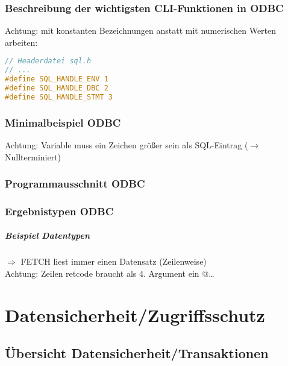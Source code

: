 \subsection{Beschreibung der wichtigsten CLI-Funktionen in ODBC}
Achtung: mit konstanten Bezeichnungen anstatt mit numerischen Werten arbeiten:
\begin{lstlisting}[language=C]
// Headerdatei sql.h
// ...
#define SQL_HANDLE_ENV 1
#define SQL_HANDLE_DBC 2
#define SQL_HANDLE_STMT 3
\end{lstlisting}

\subsection{Minimalbeispiel ODBC}
Achtung: Variable muss ein Zeichen größer sein als SQL-Eintrag ($\to$ Nullterminiert)
\subsection{Programmausschnitt ODBC}

\subsection{Ergebnistypen ODBC}
\newpage\paragraph{Beispiel Datentypen}
$\Rightarrow$ FETCH liest immer einen Datensatz (Zeilenweise)\\
Achtung: Zeilen retcode braucht als 4. Argument ein @…

\chapter{Datensicherheit/Zugriffsschutz}
\section{Übersicht Datensicherheit/Transaktionen}
